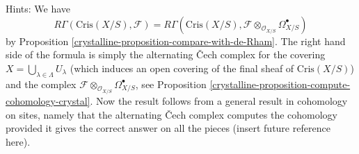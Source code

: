 \begin{remark}
\medskip\noindent
Hints: We have
$$
R\Gamma(\text{Cris}(X/S), \mathcal{F}) = R\Gamma(\text{Cris}(X/S),
\mathcal{F} \otimes_{\mathcal{O}_{X/S}} \Omega_{X/S}^\bullet)
$$
by Proposition \ref{crystalline-proposition-compare-with-de-Rham}.
The right hand side of the formula is simply the alternating {\v C}ech complex
for the covering $X = \bigcup_{\lambda \in \Lambda} U_\lambda$
(which induces an open covering of the final sheaf of $\text{Cris}(X/S)$)
and the complex $\mathcal{F} \otimes_{\mathcal{O}_{X/S}} \Omega_{X/S}^\bullet$,
see Proposition \ref{crystalline-proposition-compute-cohomology-crystal}.
Now the result follows from a general result in cohomology on sites,
namely that the alternating {\v C}ech complex computes the cohomology
provided it gives the correct answer on all the pieces (insert future
reference here).
\end{remark}


